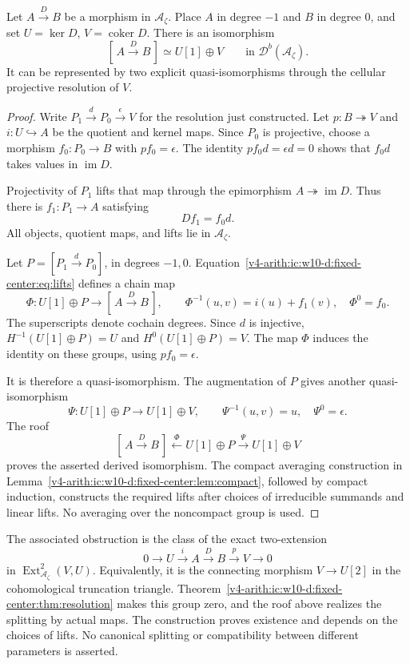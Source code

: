 \begin{theorem}\label{v4-arith:ic:w10-d:fixed-center:thm:split}
Let $A\xrightarrow{D}B$ be a morphism in $\mathcal A_\zeta$.
Place $A$ in degree $-1$ and $B$ in degree $0$, and set
$U=\ker D$, $V=\operatorname{coker} D$.
There is an isomorphism
\[
 [\,A\xrightarrow{D}B\,]\simeq U[1]\oplus V
 \qquad\text{in }\mathcal D^b(\mathcal A_\zeta).
\]
It can be represented by two explicit quasi-isomorphisms through the cellular projective resolution of $V$.
\end{theorem}
\begin{proof}
Write $P_1\xrightarrow{d}P_0\xrightarrow{\epsilon}V$ for the resolution just constructed.
Let $p:B\twoheadrightarrow V$ and $i:U\hookrightarrow A$ be the quotient and kernel maps.
Since $P_0$ is projective, choose a morphism $f_0:P_0\to B$ with $pf_0=\epsilon$.
The identity $pf_0d=\epsilon d=0$ shows that $f_0d$ takes values in $\operatorname{im}D$.

Projectivity of $P_1$ lifts that map through the epimorphism $A\twoheadrightarrow\operatorname{im}D$.
Thus there is $f_1:P_1\to A$ satisfying
\begin{equation}\label{v4-arith:ic:w10-d:fixed-center:eq:lifts}
 Df_1=f_0d.
\end{equation}
All objects, quotient maps, and lifts lie in $\mathcal A_\zeta$.

Let $P=[P_1\xrightarrow{d}P_0]$, in degrees $-1,0$.
Equation~\eqref{v4-arith:ic:w10-d:fixed-center:eq:lifts} defines a chain map
\[
 \Phi:U[1]\oplus P\longrightarrow[\,A\xrightarrow{D}B\,],
 \qquad
 \Phi^{-1}(u,v)=i(u)+f_1(v),\quad \Phi^0=f_0.
\]
The superscripts denote cochain degrees.
Since $d$ is injective, $H^{-1}(U[1]\oplus P)=U$ and $H^0(U[1]\oplus P)=V$.
The map $\Phi$ induces the identity on these groups, using $pf_0=\epsilon$.

It is therefore a quasi-isomorphism.
The augmentation of $P$ gives another quasi-isomorphism
\[
 \Psi:U[1]\oplus P\longrightarrow U[1]\oplus V,
 \qquad \Psi^{-1}(u,v)=u,\quad \Psi^0=\epsilon.
\]
The roof
\[
 [\,A\xrightarrow{D}B\,]\xleftarrow{\ \Phi\ }U[1]\oplus P
 \xrightarrow{\ \Psi\ }U[1]\oplus V
\]
proves the asserted derived isomorphism.
The compact averaging construction in Lemma~\ref{v4-arith:ic:w10-d:fixed-center:lem:compact}, followed by compact induction,
constructs the required lifts after choices of irreducible summands and linear lifts.
No averaging over the noncompact group is used.
\end{proof}

The associated obstruction is the class of the exact two-extension
\[
 0\longrightarrow U\xrightarrow{i}A\xrightarrow{D}B\xrightarrow{p}V\longrightarrow0
\]
in $\operatorname{Ext}^2_{\mathcal A_\zeta}(V,U)$.
Equivalently, it is the connecting morphism $V\to U[2]$ in the cohomological truncation triangle.
Theorem~\ref{v4-arith:ic:w10-d:fixed-center:thm:resolution} makes this group zero, and the roof above realizes the splitting by actual maps.
The construction proves existence and depends on the choices of lifts.
No canonical splitting or compatibility between different parameters is asserted.


